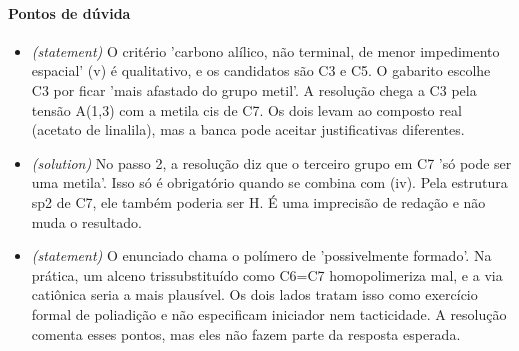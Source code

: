 \documentclass{article}%
\begin{document}
\paragraph{Pontos de dúvida}%
\begin{itemize}%
\item%
\textit{(statement)} O critério 'carbono alílico, não terminal, de menor impedimento espacial' (v) é qualitativo, e os candidatos são C3 e C5. O gabarito escolhe C3 por ficar 'mais afastado do grupo metil'. A resolução chega a C3 pela tensão A(1,3) com a metila cis de C7. Os dois levam ao composto real (acetato de linalila), mas a banca pode aceitar justificativas diferentes.%
\item%
\textit{(solution)} No passo 2, a resolução diz que o terceiro grupo em C7 'só pode ser uma metila'. Isso só é obrigatório quando se combina com (iv). Pela estrutura sp2 de C7, ele também poderia ser H. É uma imprecisão de redação e não muda o resultado.%
\item%
\textit{(statement)} O enunciado chama o polímero de 'possivelmente formado'. Na prática, um alceno trissubstituído como C6=C7 homopolimeriza mal, e a via catiônica seria a mais plausível. Os dois lados tratam isso como exercício formal de poliadição e não especificam iniciador nem tacticidade. A resolução comenta esses pontos, mas eles não fazem parte da resposta esperada.%
\end{itemize}%
\end{document}
